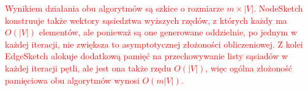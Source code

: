      \textcolor{red}{Wynikiem działania obu algorytmów są szkice o rozmiarze $m \times |V|$. NodeSketch konstruuje także wektory sąsiedztwa wyższych rzędów, z których każdy ma $O(|V|)$ elementów, ale ponieważ są one generowane oddzielnie, po jednym w każdej iteracji, nie zwiększa to asymptotycznej złożoności obliczeniowej. Z kolei EdgeSketch alokuje dodatkową pamięć na przechowywanie listy sąsiadów w każdej iteracji pętli, ale jest ona także rzędu $O(|V|)$, więc ogólna złożoność pamięciowa obu algorytmów wynosi $O(m|V|)$.}